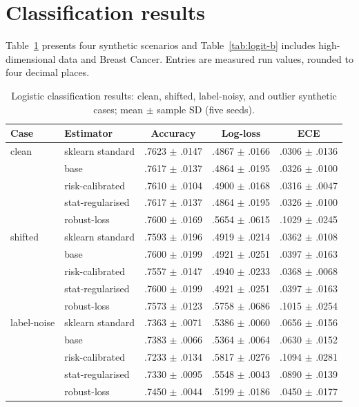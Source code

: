 \documentclass[conference]{IEEEtran}
\begin{document}
\section{Classification results}
Table~\ref{tab:logit-a} presents four synthetic scenarios and Table~\ref{tab:logit-b} includes high-dimensional data and Breast Cancer. Entries are measured run values, rounded to four decimal places.
\begin{table}[t]
\centering\scriptsize
\setlength{\tabcolsep}{2.6pt}
\caption{Logistic classification results: clean, shifted, label-noisy, and outlier synthetic cases; mean $\pm$ sample SD (five seeds).}
\label{tab:logit-a}
\begin{tabular}{llccc}
\toprule
Case & Estimator & Accuracy & Log-loss & ECE \\
\midrule
clean & sklearn standard & .7623 $\pm$ .0147 & .4867 $\pm$ .0166 & .0306 $\pm$ .0136 \\
 & base & .7617 $\pm$ .0137 & .4864 $\pm$ .0195 & .0326 $\pm$ .0100 \\
 & risk-calibrated & .7610 $\pm$ .0104 & .4900 $\pm$ .0168 & .0316 $\pm$ .0047 \\
 & stat-regularised & .7617 $\pm$ .0137 & .4864 $\pm$ .0195 & .0326 $\pm$ .0100 \\
 & robust-loss & .7600 $\pm$ .0169 & .5654 $\pm$ .0615 & .1029 $\pm$ .0245 \\
\midrule
shifted & sklearn standard & .7593 $\pm$ .0196 & .4919 $\pm$ .0214 & .0362 $\pm$ .0108 \\
 & base & .7600 $\pm$ .0199 & .4921 $\pm$ .0251 & .0397 $\pm$ .0163 \\
 & risk-calibrated & .7557 $\pm$ .0147 & .4940 $\pm$ .0233 & .0368 $\pm$ .0068 \\
 & stat-regularised & .7600 $\pm$ .0199 & .4921 $\pm$ .0251 & .0397 $\pm$ .0163 \\
 & robust-loss & .7573 $\pm$ .0123 & .5758 $\pm$ .0686 & .1015 $\pm$ .0254 \\
\midrule
label-noise & sklearn standard & .7363 $\pm$ .0071 & .5386 $\pm$ .0060 & .0656 $\pm$ .0156 \\
 & base & .7383 $\pm$ .0066 & .5364 $\pm$ .0064 & .0630 $\pm$ .0152 \\
 & risk-calibrated & .7233 $\pm$ .0134 & .5817 $\pm$ .0276 & .1094 $\pm$ .0281 \\
 & stat-regularised & .7330 $\pm$ .0095 & .5548 $\pm$ .0043 & .0890 $\pm$ .0139 \\
 & robust-loss & .7450 $\pm$ .0044 & .5199 $\pm$ .0186 & .0450 $\pm$ .0177 \\

\end{tabular}
\end{table}
\end{document}
